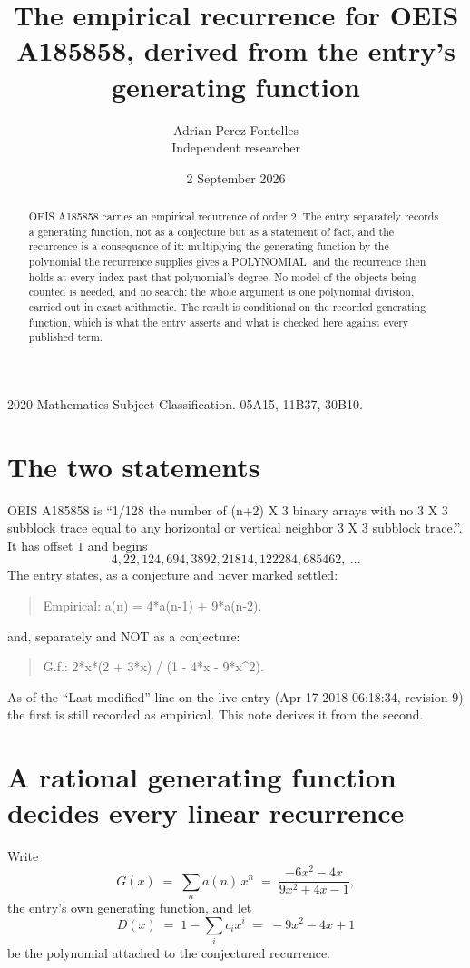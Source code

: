 \documentclass[11pt,a4paper]{article}
\title{The empirical recurrence for OEIS A185858, derived from the entry's generating function}
\author{Adrian Perez Fontelles\\ \small Independent researcher}
\date{2 September 2026}
\theoremstyle{plain}
\theoremstyle{definition}
\begin{document}
\maketitle

\begin{abstract}
OEIS A185858 carries an empirical recurrence of order $2$. The entry separately records a
generating function, not as a conjecture but as a statement of fact, and the recurrence is a
consequence of it: multiplying the generating function by the polynomial the recurrence
supplies gives a POLYNOMIAL, and the recurrence then holds at every index past that
polynomial's degree. No model of the objects being counted is needed, and no search: the
whole argument is one polynomial division, carried out in exact arithmetic. The result is
conditional on the recorded generating function, which is what the entry asserts and what is
checked here against every published term.
\end{abstract}

\noindent\small 2020 Mathematics Subject Classification. 05A15, 11B37, 30B10.\normalsize

\section{The two statements}

OEIS A185858 is ``1/128 the number of (n+2) X 3 binary arrays with no 3 X 3 subblock trace equal to any horizontal or vertical neighbor 3 X 3 subblock trace.''. It has offset $1$ and begins
\[
4, 22, 124, 694, 3892, 21814, 122284, 685462,\ \dots
\]
The entry states, as a conjecture and never marked settled:
\begin{quote}
Empirical: a(n) = 4*a(n-1) + 9*a(n-2).
\end{quote}
and, separately and NOT as a conjecture:
\begin{quote}
G.f.: 2*x*(2 + 3*x) / (1 - 4*x - 9*x\^{}2).
\end{quote}
As of the ``Last modified'' line on the live entry (Apr 17 2018 06:18:34, revision 9) the first is still
recorded as empirical. This note derives it from the second.

\section{A rational generating function decides every linear recurrence}

Write
\[
G(x)\;=\;\sum_{n}a(n)\,x^{n}\;=\;\frac{- 6 x^{2} - 4 x}{9 x^{2} + 4 x - 1},
\]
the entry's own generating function, and let
\[
D(x)\;=\;1-\sum_i c_i x^{i}\;=\;- 9 x^{2} - 4 x + 1
\]
be the polynomial attached to the conjectured recurrence.
\end{document}
